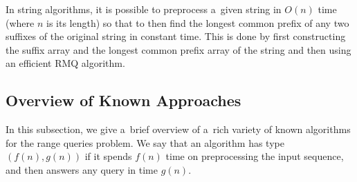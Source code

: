 \documentclass[11pt,letterpaper]{article}
\begin{document}
In string algorithms, it is possible to preprocess a~given string in $O(n)$ time (where $n$ is its length) so that to then find the longest common prefix of any two suffixes of the original string in constant time. This is done by first constructing the suffix array and the longest common prefix array of the string and then using  an efficient RMQ algorithm.


\subsection{Overview of Known Approaches}
In this subsection, we give a~brief overview of a~rich variety of known algorithms for the range queries problem. We say that an algorithm has type $(f(n), g(n))$ if it spends $f(n)$ time on preprocessing the input sequence, and then answers any query in time $g(n)$.
\end{document}
